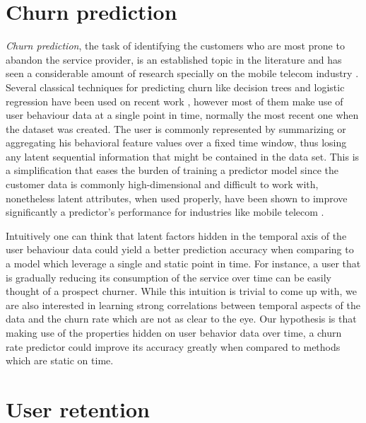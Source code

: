 \documentclass{kththesis}
\begin{document}
\section{Churn prediction}	
	
	\emph{Churn prediction}, the task of identifying the customers who are most prone to abandon the service provider, is an established topic in the literature and has seen a considerable amount of research specially on the mobile telecom industry \citep{Hassouna2015} \citep{Lu2014} \citep{Khan2015}.  Several classical techniques for predicting churn like decision trees and logistic regression have been used on recent work \citep{mahajan2015review}, however most of them make use of user behaviour data at a single point in time, normally the most recent one when the dataset was created. The user is commonly represented by summarizing or aggregating his behavioral feature values over a fixed time window, thus losing any latent sequential information that might be contained in the data set. This is a simplification that eases the burden of training a predictor model since the customer data is commonly high-dimensional and difficult to work with, nonetheless latent attributes, when used properly, have been shown to improve significantly a predictor's performance for industries like mobile telecom \citep{GurAli2014}.
    
    Intuitively one can think that latent factors hidden in the temporal axis of the user behaviour data could yield a better prediction accuracy when comparing to a model which leverage a single and static point in time. For instance, a user that is gradually reducing its consumption of the service over time can be easily thought of a prospect churner. While this intuition is trivial to come up with, we are also interested in learning strong correlations between temporal aspects of the data and the churn rate which are not as clear to the eye. Our hypothesis is that making use of the properties hidden on user behavior data over time, a churn rate predictor could improve its accuracy greatly when compared to methods which are static on time. 
    
\section{User retention}    
    
\end{document}
